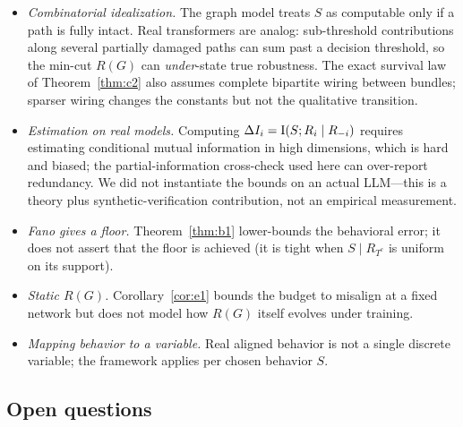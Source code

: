 \begin{itemize}[leftmargin=*,itemsep=2pt,topsep=2pt]
  \item \emph{Combinatorial idealization.} The graph model treats $S$ as computable
    only if a path is fully intact. Real transformers are analog: sub-threshold
    contributions along several partially damaged paths can sum past a decision
    threshold, so the min-cut $R(G)$ can \emph{under}-state true robustness. The exact
    survival law of Theorem~\ref{thm:c2} also assumes complete bipartite wiring between
    bundles; sparser wiring changes the constants but not the qualitative transition.
  \item \emph{Estimation on real models.} Computing $\Delta I_i=\operatorname{I}(S;R_i\mid R_{-i})$
    requires estimating conditional mutual information in high dimensions, which is
    hard and biased; the partial-information cross-check used here can over-report
    redundancy. We did not instantiate the bounds on an actual LLM---this is a theory
    plus synthetic-verification contribution, not an empirical measurement.
  \item \emph{Fano gives a floor.} Theorem~\ref{thm:b1} lower-bounds the behavioral
    error; it does not assert that the floor is achieved (it is tight when $S\mid
    R_{T^c}$ is uniform on its support).
  \item \emph{Static $R(G)$.} Corollary~\ref{cor:e1} bounds the budget to misalign at
    a fixed network but does not model how $R(G)$ itself evolves under training.
  \item \emph{Mapping behavior to a variable.} Real aligned behavior is not a single
    discrete variable; the framework applies per chosen behavior $S$.
\end{itemize}

\subsection{Open questions}

